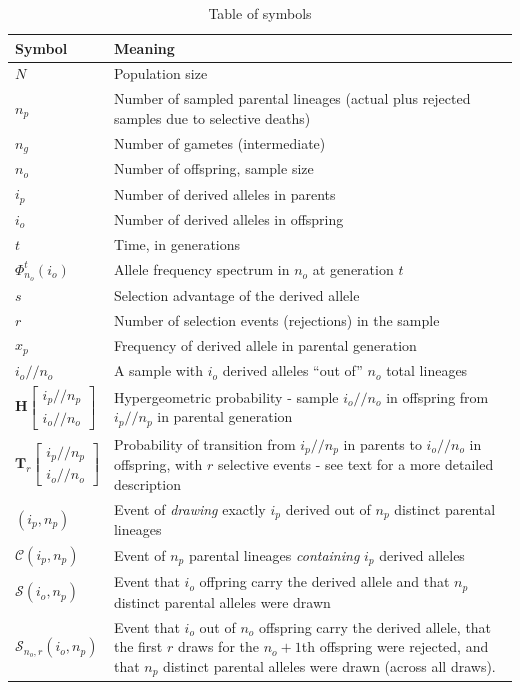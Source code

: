 \documentclass[review]{elsarticle}
\newcommand{\dslash}{/\!\!/}
\newcommand{\Coalc}[4]{\begin{bmatrix}#1\dslash #2 \\ #3\dslash #4 \end{bmatrix}}
\newcommand{\ms}{\mathcal{S}}
\begin{document}
\begin{table}
  \centering
  \begin{tabular}{l|p{100mm}}
    Symbol & Meaning\\
    \hline
    $N$ & Population size\\
    $n_p$ & Number of sampled parental lineages (actual plus rejected samples due to selective deaths)\\
    $n_g$ & Number of gametes (intermediate)\\
    $n_o$ & Number of offspring, sample size\\
    $i_p$ & Number of derived alleles in parents\\
    $i_o$ & Number of derived alleles in offspring\\
    $t$ & Time, in generations\\
    $\Phi_{n_o}^{t}(i_o)$ & Allele frequency spectrum in $n_o$ at generation $t$\\
    $s$ & Selection advantage of the derived allele\\
    $r$ & Number of selection events (rejections) in the sample\\
    $x_p$ & Frequency of derived allele in parental generation\\
    $i_o \dslash n_o$ & A sample with $i_o$ derived alleles ``out of'' $n_o$ total lineages\\
    $\mathbf{H}\Coalc{i_p}{n_p}{i_o}{n_o}$ & Hypergeometric probability -
                                             sample $i_o \dslash n_o$ in offspring from $i_p \dslash n_p$ in parental generation\\
    $\mathbf{T}_{r}\Coalc{i_p}{n_p}{i_o}{n_o}$ & Probability of transition from $i_p \dslash n_p$ in parents
                                                 to $i_o \dslash n_o$ in offspring, with $r$ selective events -
                                                 see text for a more detailed description\\
    \hline
    $(i_p, n_p)$ & Event of \textit{drawing} exactly $i_p$ derived out of $n_p$ distinct parental lineages \\
    $\mathcal{C}(i_p, n_p)$ & Event of $n_p$ parental lineages \textit{containing} $i_p$ derived alleles \\
    $\mathcal{S}(i_o, n_p)$ & Event that  $i_o$ offpring carry the derived allele and that $n_p$ distinct parental alleles were drawn \\
    $\ms_{n_o,r}(i_o, n_p)$ & Event that  $i_o$ out of $n_o$ offspring carry the derived allele, that the first $r$ draws for the 
    $n_o+1$th offspring were rejected, 
    and that $n_p$ distinct parental alleles were drawn (across all draws).
  \end{tabular}
  \caption{\label{tab_symbols} Table of symbols}
\end{table}
\end{document}

